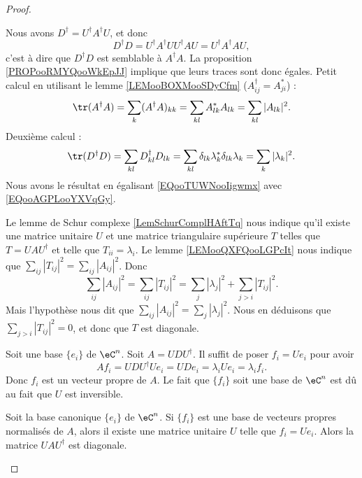 \begin{proof}
\begin{subproof}
    Nous avons $D^{\dag}=U^{\dag}A^{\dag}U$, et donc
    \begin{equation}
        D^{\dag}D=U^{\dag}A^{\dag}UU^{\dag}AU=U^{\dag}A^{\dag}AU,
    \end{equation}
    c'est à dire que \( D^{\dag}D\) est semblable à \( A^{\dag}A\). La proposition \ref{PROPooRMYQooWkEpJJ} implique que leurs traces sont donc égales. Petit calcul en utilisant le lemme \ref{LEMooBOXMooSDyCfm} (\( A^{\dag}_{ij}=A_{ji}^*\)) :
    \begin{equation}    \label{EQooAGPLooYXVqGy}
            \tr(A^{\dag}A)=\sum_k(A^{\dag}A)_{kk}
            =\sum_{kl}A^*_{lk}A_{lk}
            =\sum_{kl}| A_{lk} |^2.
    \end{equation}
    Deuxième calcul :
    \begin{equation}        \label{EQooTUWNooIigwmx}
        \tr(D^{\dag}D)=\sum_{kl}D^{\dag}_{kl}D_{lk}=\sum_{kl}\delta_{lk}\lambda_k^*\delta_{lk}\lambda_k=\sum_{k}| \lambda_k |^2.
    \end{equation}
    Nous avons le résultat en égalisant \eqref{EQooTUWNooIigwmx} avec \eqref{EQooAGPLooYXVqGy}.

    \spitem[\ref{ITEMooIIQTooQORrXP} \( \Rightarrow\) \ref{ItemJZhFPSii}]
    Le lemme de Schur complexe \ref{LemSchurComplHAftTq} nous indique qu'il existe une matrice unitaire \( U\) et une matrice triangulaire supérieure \( T\) telles que \( T=UAU^{\dag}\) et telle que \( T_{ii}=\lambda_i\). Le lemme \ref{LEMooQXFQooLGPcIt} nous indique que \( \sum_{ij}| T_{ij} |^2=\sum_{ij}| A_{ij} |^2\). Donc
    \begin{equation}
        \sum_{ij}| A_{ij} |^2=\sum_{ij}| T_{ij} |^2=\sum_j| \lambda_j |^2+\sum_{j>i}| T_{ij} |^2.
    \end{equation}
    Mais l'hypothèse nous dit que \( \sum_{ij}| A_{ij} |^2=\sum_j| \lambda_j |^2\). Nous en déduisons que \( \sum_{j>i}| T_{ij} |^2=0\), et donc que \( T\) est diagonale.

    \spitem[\ref{ItemJZhFPSii}\( \Rightarrow\) \ref{ITEMooJRKSooNfsQJb}]
    Soit une base \( \{ e_i \}\) de \( \eC^n\). Soit \( A=UDU^{\dag}\). Il suffit de poser \( f_i=Ue_i\) pour avoir
    \begin{equation}
        Af_i=UDU^{\dag}Ue_i=UDe_i=\lambda_i Ue_i=\lambda_if_i.
    \end{equation}
    Donc \( f_i\) est un vecteur propre de \( A\). Le fait que \( \{ f_i \}\) soit une base de \( \eC^n\) est dû au fait que \( U\) est inversible.

    \spitem[\ref{ITEMooJRKSooNfsQJb} \( \Rightarrow\) \ref{ItemJZhFPSii}]
    Soit la base canonique \( \{ e_i \}\) de \( \eC^n\). Si \( \{ f_i \}\) est une base de vecteurs propres normalisés de \( A\), alors il existe une matrice unitaire \( U\) telle que \( f_i=Ue_i\). Alors la matrice \( UAU^{\dag}\) est diagonale.
    \end{subproof}
\end{proof}

